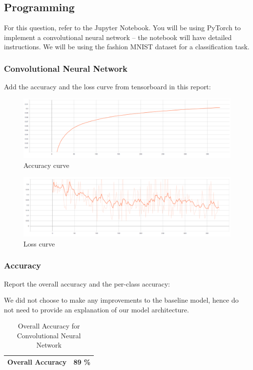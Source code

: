 \subsection{Programming}
For this question, refer to the Jupyter Notebook. You will be using PyTorch to implement a convolutional neural network -- the notebook will have detailed instructions. We will be using the fashion MNIST dataset for a classification task.

\subsubsection{Convolutional Neural Network}
Add the accuracy and the loss curve from tensorboard in this report:

\begin{figure}[H]
    \centering
    \includegraphics[width=1.0\textwidth]{templates/accuracy}
    \caption{Accuracy curve}
    \label{fig:acc_curve}
\end{figure}

\begin{figure}[H]
    \centering
    \includegraphics[width=1.0\textwidth]{templates/loss}
    \caption{Loss curve}
    \label{fig:loss_curve}
\end{figure}

\subsubsection{Accuracy}
 Report the overall accuracy and the per-class accuracy:

We did not choose to make any improvements to the baseline model, hence do not need to provide an explanation of our model architecture.
\begin{table}[H]
\centering
\begin{tabular}{ |c|c| } 
 \hline
 Overall Accuracy & 89 \% \\
 \hline
\end{tabular}
\caption{Overall Accuracy for Convolutional Neural Network}
\label{nnOA}
\end{table}


